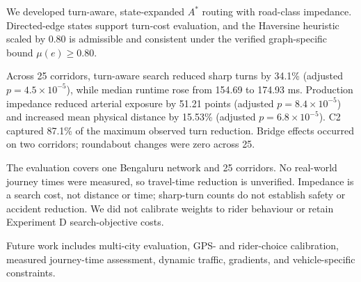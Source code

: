 \documentclass[11pt,conference]{IEEEtran}
\begin{document}
We developed turn-aware, state-expanded $A^*$ routing with road-class impedance. Directed-edge states support turn-cost evaluation, and the Haversine heuristic scaled by 0.80 is admissible and consistent under the verified graph-specific bound $\mu(e)\ge0.80$.

Across 25 corridors, turn-aware search reduced sharp turns by 34.1\% (adjusted $p=4.5\times10^{-5}$), while median runtime rose from 154.69 to 174.93 ms. Production impedance reduced arterial exposure by 51.21 points (adjusted $p=8.4\times10^{-5}$) and increased mean physical distance by 15.53\% (adjusted $p=6.8\times10^{-5}$). C2 captured 87.1\% of the maximum observed turn reduction. Bridge effects occurred on two corridors; roundabout changes were zero across 25.

The evaluation covers one Bengaluru network and 25 corridors. No real-world journey times were measured, so travel-time reduction is unverified. Impedance is a search cost, not distance or time; sharp-turn counts do not establish safety or accident reduction. We did not calibrate weights to rider behaviour or retain Experiment D search-objective costs.

Future work includes multi-city evaluation, GPS- and rider-choice calibration, measured journey-time assessment, dynamic traffic, gradients, and vehicle-specific constraints.

\balance


\end{document}
